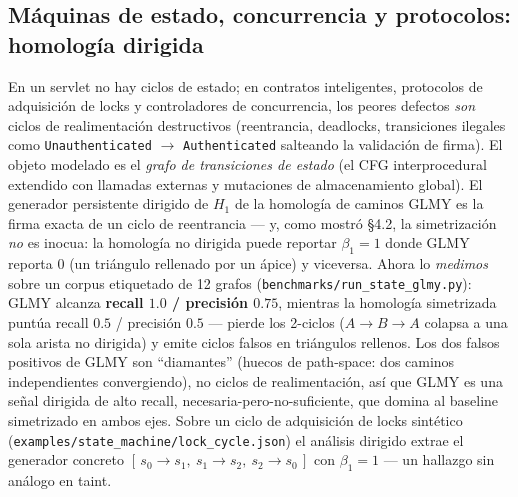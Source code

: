 \documentclass[11pt]{article}
\begin{document}
\subsection{Máquinas de estado, concurrencia y protocolos: homología dirigida}
En un servlet no hay ciclos de estado; en contratos inteligentes, protocolos de
adquisición de locks y controladores de concurrencia, los peores defectos
\emph{son} ciclos de realimentación destructivos (reentrancia, deadlocks,
transiciones ilegales como \texttt{Unauthenticated} $\to$ \texttt{Authenticated}
salteando la validación de firma). El objeto modelado es el \emph{grafo de
transiciones de estado} (el CFG interprocedural extendido con llamadas externas
y mutaciones de almacenamiento global). El generador persistente dirigido de
$H_1$ de la homología de caminos GLMY es la firma exacta de un ciclo de
reentrancia --- y, como mostró \S4.2, la simetrización \emph{no} es inocua: la
homología no dirigida puede reportar $\beta_1=1$ donde GLMY reporta $0$ (un
triángulo rellenado por un ápice) y viceversa. Ahora lo \emph{medimos} sobre un
corpus etiquetado de 12 grafos (\texttt{benchmarks/run\_state\_glmy.py}): GLMY
alcanza \textbf{recall $1.0$ / precisión $0.75$}, mientras la homología
simetrizada puntúa recall $0.5$ / precisión $0.5$ --- pierde los 2-ciclos
($A\to B\to A$ colapsa a una sola arista no dirigida) y emite ciclos falsos en
triángulos rellenos. Los dos falsos positivos de GLMY son ``diamantes'' (huecos
de path-space: dos caminos independientes convergiendo), no ciclos de
realimentación, así que GLMY es una señal dirigida de alto recall,
necesaria-pero-no-suficiente, que domina al baseline simetrizado en ambos ejes.
Sobre un ciclo de adquisición de locks sintético
(\texttt{examples/state\_machine/lock\_cycle.json}) el análisis
dirigido extrae el generador concreto $[\,s_0\!\to\!s_1,\ s_1\!\to\!s_2,\
s_2\!\to\!s_0\,]$ con $\beta_1=1$ --- un hallazgo sin análogo en taint.
\end{document}
